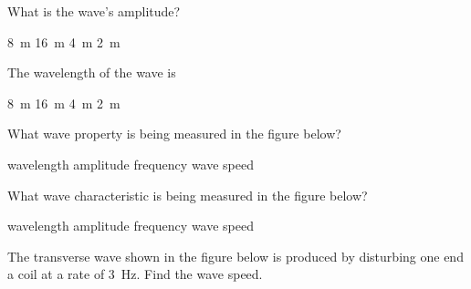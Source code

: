 \documentclass[answers]{exam}
\begin{document}
\begin{questions}

\question \label{Q1}
What is the wave's amplitude?

\begin{randomizechoices}
    \correctchoice \SI{8}{m}
    \choice \SI{16}{m}
    \choice \SI{4}{m}
    \choice \SI{2}{m}
\end{randomizechoices}

\question \label{Q2}
The wavelength of the wave is

\begin{randomizechoices}
    \choice \SI{8}{m}
    \choice \SI{16}{m}
    \correctchoice \SI{4}{m}
    \choice \SI{2}{m}
\end{randomizechoices}

\question
What wave property is being measured in the figure below?

\begin{center}
\end{center}

\begin{randomizechoices}
    \correctchoice wavelength
    \choice amplitude
    \choice frequency
    \choice wave speed
\end{randomizechoices}

\question
What wave characteristic is being measured in the figure below?

\begin{center}
\end{center}

\begin{randomizechoices}
    \choice wavelength
    \correctchoice amplitude
    \choice frequency
    \choice wave speed
\end{randomizechoices}

\question 
The transverse wave shown in the figure below is produced by disturbing one end a coil at a rate of \SI{3}{Hz}. Find the wave speed.

\begin{center}
\end{center}


\end{questions}
\end{document}
